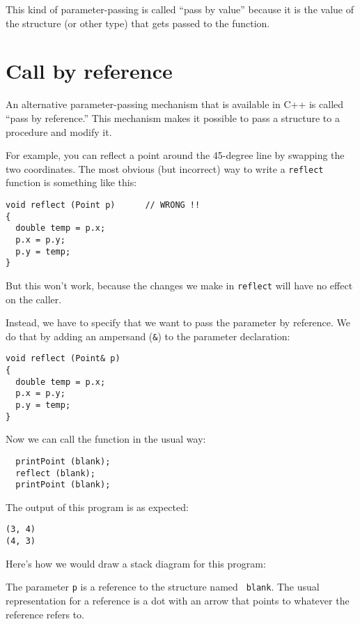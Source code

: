 This kind of parameter-passing is called ``pass by value''
because it is the value of the structure (or other type) that
gets passed to the function.

\section{Call by reference}

An alternative parameter-passing mechanism that is available
in C++ is called ``pass by reference.''  This mechanism makes
it possible to pass a structure to a procedure and modify it.

For example, you can reflect a point around the 45-degree line by
swapping the two coordinates.  The most obvious (but incorrect) way to
write a {\tt reflect} function is something like this:

\begin{verbatim}
void reflect (Point p)      // WRONG !!
{
  double temp = p.x;
  p.x = p.y;
  p.y = temp;
}
\end{verbatim}
%
But this won't work, because the changes we make in {\tt reflect}
will have no effect on the caller.

Instead, we have to specify that we want to pass the parameter by
reference.  We do that by adding an ampersand ({\tt \&}) to the
parameter declaration:

\begin{verbatim}
void reflect (Point& p)
{
  double temp = p.x;
  p.x = p.y;
  p.y = temp;
}
\end{verbatim}
%
Now we can call the function in the usual way:

\begin{verbatim}
  printPoint (blank);
  reflect (blank);
  printPoint (blank);
\end{verbatim}
%
The output of this program is as expected:

\begin{verbatim}
(3, 4)
(4, 3)
\end{verbatim}
%
Here's how we would draw a stack diagram for this program:

\vspace{0.1in}
\centerline{}
\vspace{0.1in}
%
The parameter {\tt p} is a reference to the structure named {\tt
blank}.  The usual representation for a reference is a dot with an
arrow that points to whatever the reference refers to.

